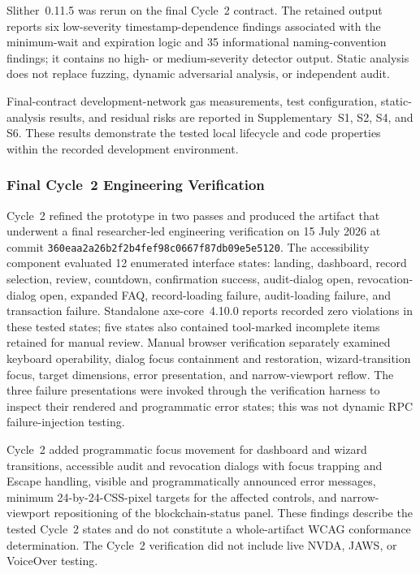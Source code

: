 \documentclass[journal]{IEEEtran}
\begin{document}
Slither~0.11.5 was rerun on the final Cycle~2 contract. The retained output reports six low-severity timestamp-dependence findings associated with the minimum-wait and expiration logic and 35 informational naming-convention findings; it contains no high- or medium-severity detector output. Static analysis does not replace fuzzing, dynamic adversarial analysis, or independent audit.

Final-contract development-network gas measurements, test configuration, static-analysis results, and residual risks are reported in Supplementary~S1, S2, S4, and S6. These results demonstrate the tested local lifecycle and code properties within the recorded development environment.

\subsubsection{Final Cycle~2 Engineering Verification}

Cycle~2 refined the prototype in two passes and produced the artifact that underwent a final researcher-led engineering verification on 15 July 2026 at commit \texttt{360eaa2a26b2f2b4fef98c0667f87db09e5e5120}. The accessibility component evaluated 12 enumerated interface states: landing, dashboard, record selection, review, countdown, confirmation success, audit-dialog open, revocation-dialog open, expanded FAQ, record-loading failure, audit-loading failure, and transaction failure. Standalone axe-core~4.10.0 reports recorded zero violations in these tested states; five states also contained tool-marked incomplete items retained for manual review. Manual browser verification separately examined keyboard operability, dialog focus containment and restoration, wizard-transition focus, target dimensions, error presentation, and narrow-viewport reflow. The three failure presentations were invoked through the verification harness to inspect their rendered and programmatic error states; this was not dynamic RPC failure-injection testing.

Cycle~2 added programmatic focus movement for dashboard and wizard transitions, accessible audit and revocation dialogs with focus trapping and Escape handling, visible and programmatically announced error messages, minimum 24-by-24-CSS-pixel targets for the affected controls, and narrow-viewport repositioning of the blockchain-status panel. These findings describe the tested Cycle~2 states and do not constitute a whole-artifact WCAG conformance determination. The Cycle~2 verification did not include live NVDA, JAWS, or VoiceOver testing.
\end{document}
